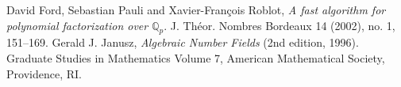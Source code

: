 \documentclass{article}
\begin{document}

\begin{thebibliography}{10}
 David Ford, Sebastian Pauli and Xavier-Fran\c cois Roblot, {\em
  A fast algorithm for polynomial factorization over $\mathbb{Q}_p$}. J.
  Th\'eor. Nombres Bordeaux 14 (2002), no. 1, 151--169.
 Gerald J. Janusz, {\em Algebraic Number Fields} (2nd
  edition, 1996).  Graduate Studies in Mathematics Volume 7, American
  Mathematical Society, Providence, RI.
\end{thebibliography}
\end{document}

